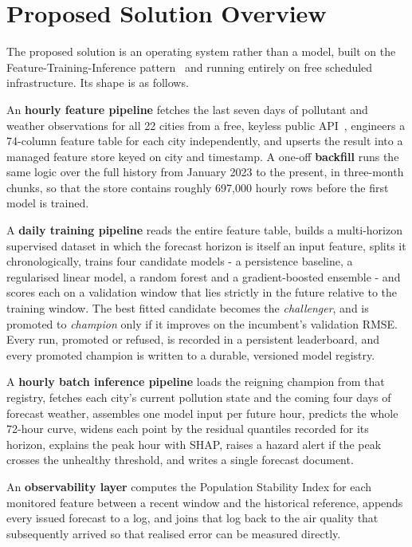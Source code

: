 \section{Proposed Solution Overview}
The proposed solution is an operating system rather than a model, built on the
Feature-Training-Inference pattern~\cite{ref:fti} and running entirely on free
scheduled infrastructure. Its shape is as follows.

An \textbf{hourly feature pipeline} fetches the last seven days of pollutant and
weather observations for all 22 cities from a free, keyless public
API~\cite{ref:openmeteo}, engineers a 74-column feature table for each city
independently, and upserts the result into a managed feature store keyed on city
and timestamp. A one-off \textbf{backfill} runs the same logic over the full
history from January 2023 to the present, in three-month chunks, so that the
store contains roughly 697,000 hourly rows before the first model is trained.

A \textbf{daily training pipeline} reads the entire feature table, builds a
multi-horizon supervised dataset in which the forecast horizon is itself an input
feature, splits it chronologically, trains four candidate models - a persistence
baseline, a regularised linear model, a random forest and a gradient-boosted
ensemble - and scores each on a validation window that lies strictly in the
future relative to the training window. The best fitted candidate becomes the
\emph{challenger}, and is promoted to \emph{champion} only if it improves on the
incumbent's validation RMSE. Every run, promoted or refused, is recorded in a
persistent leaderboard, and every promoted champion is written to a durable,
versioned model registry.

A \textbf{hourly batch inference pipeline} loads the reigning champion from that
registry, fetches each city's current pollution state and the coming four days of
forecast weather, assembles one model input per future hour, predicts the whole
72-hour curve, widens each point by the residual quantiles recorded for its
horizon, explains the peak hour with SHAP, raises a hazard alert if the peak
crosses the unhealthy threshold, and writes a single forecast document.

An \textbf{observability layer} computes the Population Stability Index for each
monitored feature between a recent window and the historical reference, appends
every issued forecast to a log, and joins that log back to the air quality that
subsequently arrived so that realised error can be measured directly.

